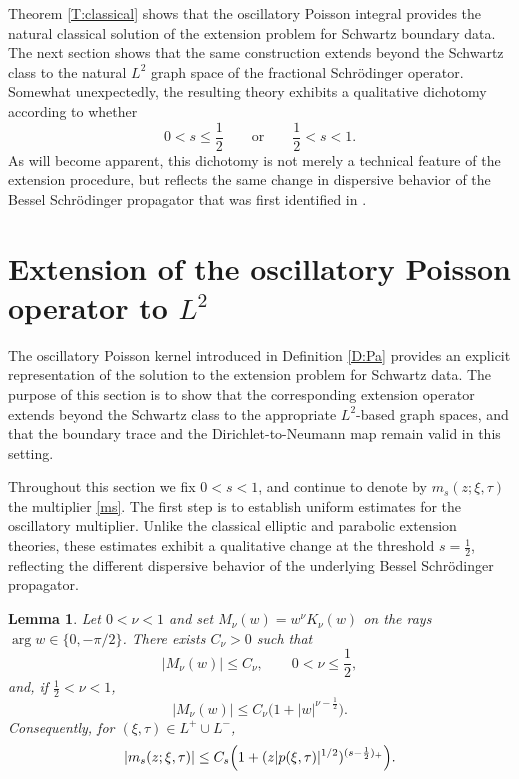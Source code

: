 \documentclass[11pt,letter]{amsart}
\numberwithin{equation}{section}
\newtheorem{lemma}[theorem]{Lemma}
\numberwithin{equation}{section}
\begin{document}
Theorem \ref{T:classical} shows that the oscillatory Poisson integral provides the
natural classical solution of the extension problem for Schwartz boundary
data. The next section shows that the same construction extends beyond
the Schwartz class to the natural $L^2$ graph space of the fractional
Schr\"odinger operator. Somewhat unexpectedly, the resulting theory
exhibits a qualitative dichotomy according to whether
\[
0<s\le\frac12
\qquad\text{or}\qquad
\frac12<s<1.
\]
As will become apparent, this dichotomy is not merely a technical feature
of the extension procedure, but reflects the same change in dispersive
behavior of the Bessel Schr\"odinger propagator that was first identified
in \cite{GS1,GS2}.






\section{Extension of the oscillatory Poisson operator to $L^2$}\label{S:L2poi}

The oscillatory Poisson kernel introduced in Definition \ref{D:Pa} provides an explicit
representation of the solution to the extension problem for Schwartz data.
The purpose of this section is to show that the corresponding extension operator
extends beyond the Schwartz class to the appropriate $L^2$-based graph spaces, and that the boundary trace and the
Dirichlet-to-Neumann map remain valid in this setting.

Throughout this section we fix
$0<s<1$, 
and continue to denote by
$m_s(z;\xi,\tau)$
the multiplier \eqref{ms}.
The first step is to establish uniform estimates for the oscillatory
multiplier. Unlike the classical elliptic and parabolic extension
theories, these estimates exhibit a qualitative change at the threshold
\(s=\frac12\), reflecting the different dispersive behavior of the
underlying Bessel Schr\"odinger propagator.


\begin{lemma}\label{L:MultiplierBound}
Let $0<\nu<1$ and set $M_\nu(w)=w^\nu K_\nu(w)$ on the rays
$\arg w\in\{0,-\pi/2\}$. There exists $C_\nu>0$ such that
\[
|M_\nu(w)|\le C_\nu,\qquad 0<\nu\le\frac12,
\]
and, if $\frac12<\nu<1$,
\[
|M_\nu(w)|\le C_\nu\bigl(1+|w|^{\nu-\frac12}\bigr).
\]
Consequently, for $(\xi,\tau)\in L^+\cup L^-$,
\[
|m_s(z;\xi,\tau)|\le C_s
\Bigl(1+(z|p(\xi,\tau)|^{1/2})^{(s-\frac12)_+}\Bigr).
\]
\end{lemma}
\end{document}
